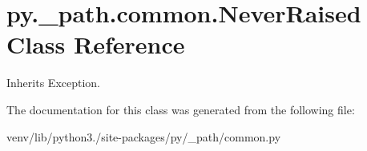\hypertarget{classpy_1_1__path_1_1common_1_1_never_raised}{}\section{py.\+\_\+path.\+common.\+Never\+Raised Class Reference}
\label{classpy_1_1__path_1_1common_1_1_never_raised}


Inherits Exception.



The documentation for this class was generated from the following file\+:\begin{DoxyCompactItemize}
\item 
venv/lib/python3./site-\/packages/py/\+\_\+path/common.\+py\end{DoxyCompactItemize}
